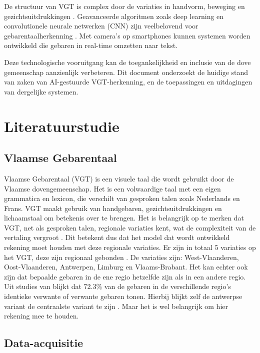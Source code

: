 De structuur van VGT is complex door de variaties in handvorm, beweging en gezichtsuitdrukkingen \autocite{469340}. Geavanceerde algoritmen zoals deep learning en convolutionele neurale netwerken (CNN) zijn veelbelovend voor gebarentaalherkenning \autocite{10.52756/ijerr.2023.v34spl.004}\autocite{10.17485/ijst/v16i45.2583}. Met camera's op smartphones kunnen systemen worden ontwikkeld die gebaren in real-time omzetten naar tekst.

Deze technologische vooruitgang kan de toegankelijkheid en inclusie van de dove gemeenschap aanzienlijk verbeteren. Dit document onderzoekt de huidige stand van zaken van AI-gestuurde VGT-herkenning, en de toepassingen en uitdagingen van dergelijke systemen.
\section{Literatuurstudie}%
\label{sec:literatuurstudie}

\subsection{Vlaamse Gebarentaal}
\label{subsec:vgt}

Vlaamse Gebarentaal (VGT) is een visuele taal die wordt gebruikt door de Vlaamse dovengemeenschap. 
Het is een volwaardige taal met een eigen grammatica en lexicon, die verschilt van gesproken talen zoals Nederlands en Frans. 
VGT maakt gebruik van handgebaren, gezichtsuitdrukkingen en lichaamstaal om betekenis over te brengen. 
Het is belangrijk op te merken dat VGT, net als gesproken talen, regionale variaties kent, wat de complexiteit van de vertaling vergroot \autocite{469340}.
Dit betekent dus dat het model dat wordt ontwikkeld rekening moet houden met deze regionale variaties.
Er zijn in totaal 5 variaties op het VGT, deze zijn regionaal gebonden \autocite{469340}.
De variaties zijn: West-Vlaanderen, Oost-Vlaanderen, Antwerpen, Limburg en Vlaams-Brabant.
Het kan echter ook zijn dat bepaalde gebaren in de ene regio hetzelfde zijn als in een andere regio.
Uit studies van \textcite{469340} blijkt dat 72.3\% van de gebaren in de verschillende regio's identieke verwante of verwante gebaren tonen.
Hierbij blijkt zelf de antwerpse variant de centraalste variant te zijn \autocite{469340}.
Maar het is wel belangrijk om hier rekening mee te houden.


\subsection{Data-acquisitie}
\label{subsec:data-acquisitie}

